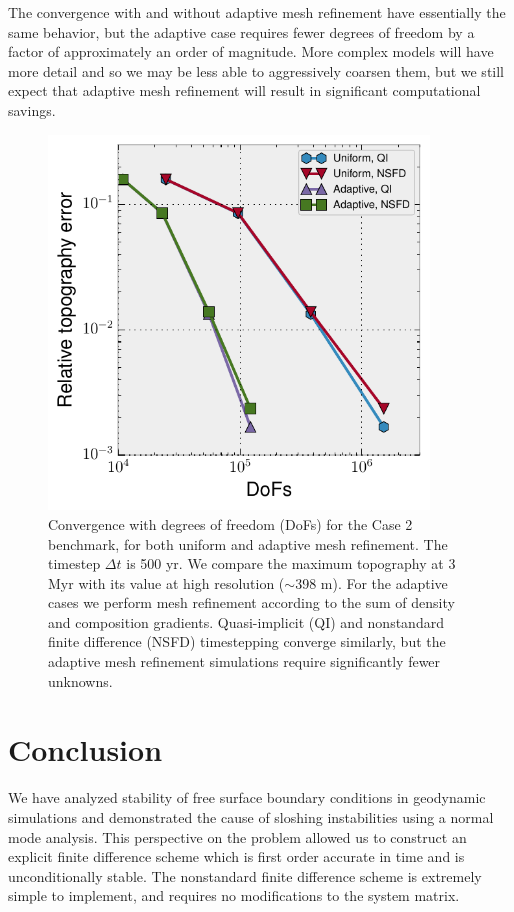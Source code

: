 \documentclass[preprint,12pt,authoryear]{elsarticle}
\begin{document}
The convergence with and without adaptive mesh refinement have essentially the same behavior, but the adaptive case requires 
fewer degrees of freedom by a factor of approximately an order of magnitude. More complex models will have
more detail and so we may be less able to aggressively coarsen them, but we still expect that adaptive mesh refinement 
will result in significant computational savings.

\begin{figure}
\includegraphics[width=0.9\textwidth]{figures/amr.pdf}
\caption{Convergence with degrees of freedom (DoFs) for the \citet{crameri2012comparison} Case 2 benchmark, for both uniform and adaptive mesh refinement. The timestep $\Delta t$ is 500 yr. We compare the maximum topography at 3 Myr with its value at high resolution ($\sim$398 m). For the adaptive cases we perform mesh refinement according to the sum of density and composition gradients. Quasi-implicit (QI) and nonstandard finite difference (NSFD) timestepping converge similarly, but the adaptive mesh refinement simulations require significantly fewer unknowns.}
\label{fig:amr}
\end{figure}

\section{Conclusion}
We have analyzed stability of free surface boundary conditions in geodynamic simulations and 
demonstrated the cause of sloshing instabilities using a normal mode analysis.
This perspective on the problem allowed us to construct an explicit finite difference 
scheme which is first order accurate in time and is unconditionally stable.
The nonstandard finite difference scheme is extremely simple to implement, and 
requires no modifications to the system matrix.
\end{document}
